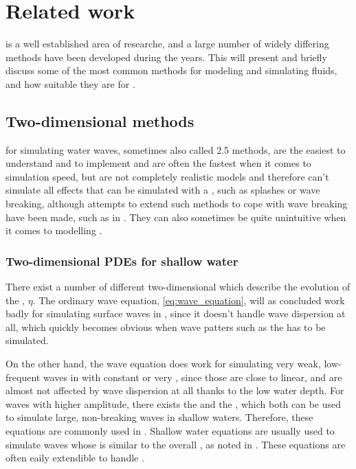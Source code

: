 \chapter{Related work}


\CFD is a well established area of researche, and a large number of widely differing methods have been developed during the years. This \levelname will present and briefly discuss some of the most common methods for modeling and simulating fluids, and how suitable they are for \thisprojectwork.

\section{Two-dimensional methods}

 for simulating water waves, sometimes also called 2.5 methods, are the easiest to understand and to implement and are often the fastest when it comes to simulation speed, but are not completely realistic models and therefore can't simulate all effects that can be simulated with a , such as splashes or wave breaking, although attempts to extend such methods to cope with wave breaking have been made, such as in \citep{Miklos2009}. They can also sometimes be quite unintuitive when it comes to modelling \FSI.

\subsection{Two-dimensional PDEs for shallow water}

There exist a number of different two-dimensional \PDEs which describe the evolution of the , $\eta$. The ordinary wave equation, \eqref{eq:wave_equation}, will as concluded work badly for simulating surface waves in , since it doesn't handle wave dispersion at all, which quickly becomes obvious when wave patters such as the  has to be simulated.

On the other hand, the wave equation does work for simulating very weak, low-frequent waves in  with constant or very , since those are close to linear, and are almost not affected by wave dispersion at all thanks to the low water depth. For waves with higher amplitude, there exists the  and the , which both can be used to simulate large, non-breaking waves in shallow waters. Therefore, these equations are commonly used in \SWS. Shallow water equations are usually used to simulate waves whose \wavelength is similar to the overall , as noted in \citep{Thurey2006}. These equations are often eaily extendible to handle \FSI.

